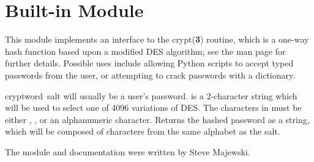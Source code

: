 \section{Built-in Module }
\label{module-crypt}

This module implements an interface to the crypt({\bf 3}) routine,
which is a one-way hash function based upon a modified DES algorithm;
see the \UNIX{} man page for further details.  Possible uses include
allowing Python scripts to accept typed passwords from the user, or
attempting to crack \UNIX{} passwords with a dictionary.

\renewcommand{\indexsubitem}{(in module crypt)}
\begin{funcdesc}{crypt}{word\, salt} 
 will usually be a user's password.   is a
2-character string which will be used to select one of 4096 variations
of DES.  The characters in  must be either ,
\code{/}, or an alphanumeric character.  Returns the hashed password
as a string, which will be composed of characters from the same
alphabet as the salt.
\end{funcdesc}

The module and documentation were written by Steve Majewski.
